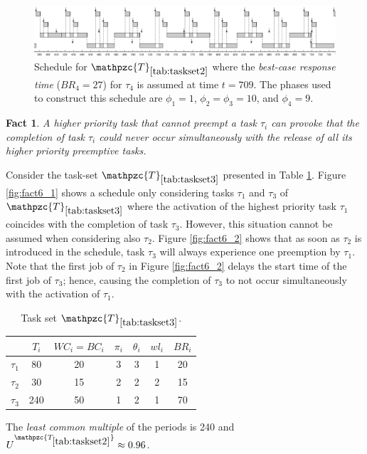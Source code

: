 \documentclass[fleqn]{article}
\newtheorem{fact}{Fact}
\begin{document}
\begin{figure}[H]
	\centering
	\includegraphics[width=1.1\linewidth]{figures/fact5_2}
	\caption{Schedule for $\mathpzc{T}_{\ref{tab:taskset2}}$ where the \textit{best-case response time} ($BR_4 = 27$) for $\tau_4$ is assumed at time $t=709$. The phases used to construct this schedule are $\phi_1 = 1$, $\phi_2 = \phi_3 = 10$, and $\phi_4 = 9$.}
	\label{fig:fact5_2}
\end{figure}

\begin{fact}
	A higher priority task that cannot preempt a task $\tau_i$ can provoke that the completion of task $\tau_i$ could never occur simultaneously with the release of all its higher priority preemptive tasks.
\end{fact}

Consider the task-set $\mathpzc{T}_{\ref{tab:taskset3}}$ presented in Table \ref{tab:taskset3}. Figure \ref{fig:fact6_1} shows a schedule only considering tasks $\tau_1$ and $\tau_3$  of $\mathpzc{T}_{\ref{tab:taskset3}}$ where the activation of the highest priority task $\tau_1$ coincides with the completion of task $\tau_3$. However, this situation cannot be assumed when considering also $\tau_2$. Figure \ref{fig:fact6_2} shows that as soon as $\tau_2$ is introduced in the schedule, task $\tau_3$ will always experience one preemption by $\tau_1$. Note that the first job of $\tau_2$ in Figure \ref{fig:fact6_2} delays the start time of the first job of $\tau_3$; hence, causing the completion of $\tau_3$ to not occur simultaneously with the activation of $\tau_1$.

\begin{table}[H]
	\center
	\caption{Task set $\mathpzc{T}_{\ref{tab:taskset3}}$.}
	\label{tab:taskset3}
	\begin{tabular}{c c c c c | c c}
		\hline 
		& $T_i$ & $WC_i=BC_i$ & $\pi_i$ & $\theta_i$ &  $wl_i$ & $BR_i$\\ 
		\hline 
		$\tau_1$& 80  & 20  & 3 & 3 &  1 & 20\\ 
		$\tau_2$& 30  & 15  & 2 & 2 &  2 & 15\\ 
		$\tau_3$& 240 & 50  & 1 & 2 &  1 & 70\\ 
		\hline 
	\end{tabular}
	\small
	\item The \textit{least common multiple} of the periods is 240 and $U^{\mathpzc{T_{\ref{tab:taskset2}}}} \approx 0.96$.
\end{table} 
\end{document}

